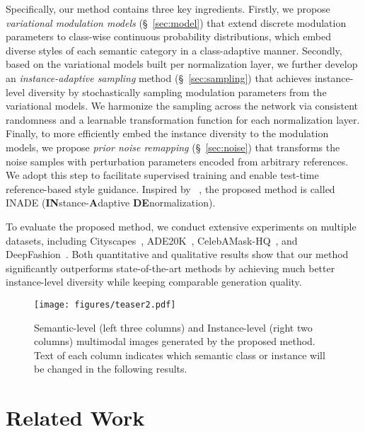 \documentclass[final]{cvpr}
\begin{document}
Specifically, our method contains three key ingredients. Firstly, we propose \textit{variational modulation models} (\S~\ref{sec:model}) that extend discrete modulation parameters to class-wise continuous probability distributions, which embed diverse styles of each semantic category in a class-adaptive manner. Secondly, based on the variational models built per normalization layer, we further develop an \textit{instance-adaptive sampling} method (\S~\ref{sec:sampling}) that achieves instance-level diversity by stochastically sampling modulation parameters from the variational models. We harmonize the sampling across the network via consistent randomness and a learnable transformation function for each normalization layer. Finally, to more efficiently embed the instance diversity to the modulation models, we propose \textit{prior noise remapping} (\S~\ref{sec:noise}) that transforms the noise samples with perturbation parameters encoded from arbitrary references. We adopt this step to facilitate supervised training and enable test-time reference-based style guidance. Inspired by ~\cite{park2019semantic,tan2020rethinking,tan2020semantic}, the proposed method is called INADE (\textbf{IN}stance-\textbf{A}daptive \textbf{DE}normalization).

To evaluate the proposed method, we conduct extensive experiments on multiple datasets, including Cityscapes~\cite{cordts2016cityscapes}, ADE20K~\cite{zhou2017scene}, CelebAMask-HQ~\cite{lee2020maskgan,karras2017progressive,liu2015deep}, and DeepFashion~\cite{liu2016deepfashion}. Both quantitative and qualitative results show that our method significantly outperforms state-of-the-art methods by achieving much better instance-level diversity while keeping comparable generation quality. 

\begin{figure}[tp]
  \centering
  \texttt{[image: figures/teaser2.pdf]}
  \caption{Semantic-level (left three columns) and Instance-level (right two columns) multimodal images generated by the proposed method. Text of each column indicates which semantic class or instance will be changed in the following results.}
  \label{fig:teaser}
\end{figure}

\section{Related Work}
\end{document}
